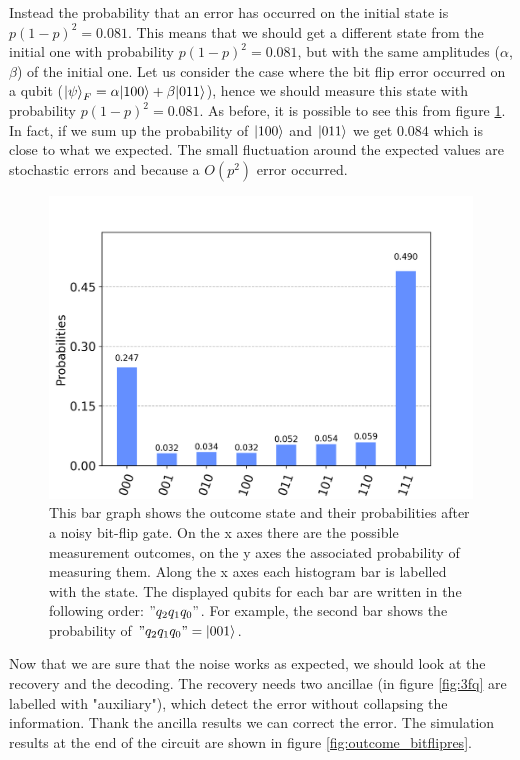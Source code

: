 Instead the probability that an error has occurred on the initial state is $p(1-p)^2 = 0.081$. This means that we should get a different state from the initial one with probability $p(1-p)^2 = 0.081$, but with the same amplitudes ($\alpha$,$\beta$) of the initial one. Let us consider the case where the bit flip error occurred on a qubit ($\ket{\psi}_F = \alpha|100\rangle+\beta|011\rangle$), hence we should measure this state with probability $p(1-p)^2 = 0.081$. As before, it is possible to see this from figure \ref{fig:justaftererror}. In fact, if we sum up the probability of $\ket{100}$ and $\ket{011}$ we get $0.084$ which is close to what we expected.
The small fluctuation around the expected values are stochastic errors and because a $O(p^2)$ error occurred.
\begin{figure}[h!]
    \centering
    \includegraphics[scale=0.7]{Mainmatter/images/Measure_just_after.png}
    \caption{This bar graph shows the outcome state and their probabilities after a noisy bit-flip gate. On the x axes there are the possible measurement outcomes, on the y axes the associated probability of measuring them. Along the x axes each histogram bar is labelled with the state. The displayed qubits for each bar are written in the following order: $"q_2 q_1 q_0"$. For example, the second bar shows the probability of $"q_2 q_1 q_0"=\ket{001}$.}
    \label{fig:justaftererror}
\end{figure}

Now that we are sure that the noise works as expected, we should look at the recovery and the decoding. The recovery needs two ancillae (in figure \ref{fig:3fq} are labelled with "auxiliary"), which detect the error without collapsing the information. Thank the ancilla results we can correct the error. 
The simulation results at the end of the circuit are shown in figure \ref{fig:outcome_bitflipres}.


